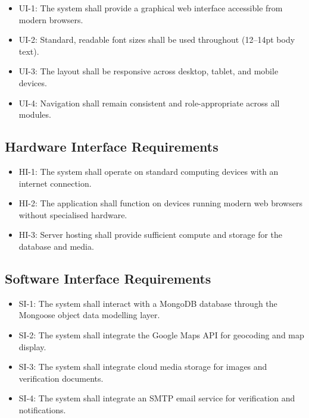 \begin{itemize}
\item UI-1: The system shall provide a graphical web interface accessible from modern browsers.
\item UI-2: Standard, readable font sizes shall be used throughout (12--14pt body text).
\item UI-3: The layout shall be responsive across desktop, tablet, and mobile devices.
\item UI-4: Navigation shall remain consistent and role-appropriate across all modules.
\end{itemize}

\subsection{Hardware Interface Requirements}

\begin{itemize}
\item HI-1: The system shall operate on standard computing devices with an internet connection.
\item HI-2: The application shall function on devices running modern web browsers without specialised hardware.
\item HI-3: Server hosting shall provide sufficient compute and storage for the database and media.
\end{itemize}

\subsection{Software Interface Requirements}

\begin{itemize}
\item SI-1: The system shall interact with a MongoDB database through the Mongoose object data modelling layer.
\item SI-2: The system shall integrate the Google Maps API for geocoding and map display.
\item SI-3: The system shall integrate cloud media storage for images and verification documents.
\item SI-4: The system shall integrate an SMTP email service for verification and notifications.
\end{itemize}

